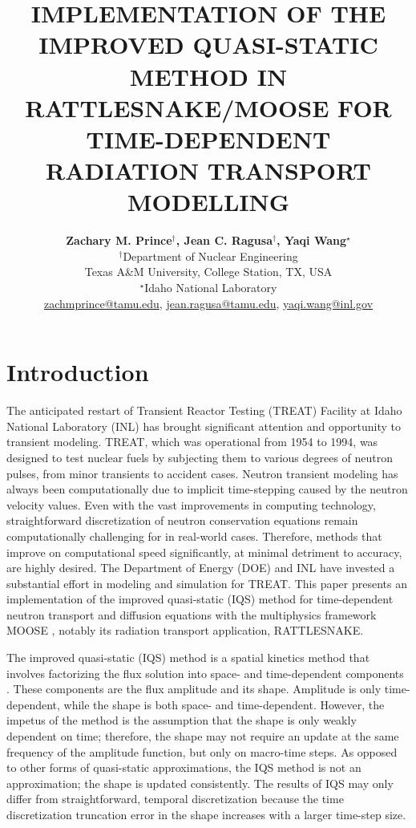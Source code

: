 \documentclass[12pt]{article}
\title{IMPLEMENTATION OF THE IMPROVED QUASI-STATIC METHOD IN RATTLESNAKE/MOOSE FOR TIME-DEPENDENT RADIATION TRANSPORT MODELLING}
\author{ 
  \textbf{Zachary M. Prince$^\dagger$, Jean C. Ragusa$^\dagger$, Yaqi Wang$^\star$} \\
 $^\dagger$Department of Nuclear Engineering \\
  Texas A\&M University, College Station, TX, USA\\
  $^\star$Idaho National Laboratory\\
  \href{mailto:zachmprince@tamu.edu}{zachmprince@tamu.edu}, \href{jean.ragusa@tamu.edu}{jean.ragusa@tamu.edu}, \href{yaqi.wang@inl.gov}{yaqi.wang@inl.gov} 
}
\begin{document}

\maketitle

%
\section{Introduction}
\label{sect::intro}

The anticipated restart of Transient Reactor Testing (TREAT) Facility at Idaho National Laboratory (INL) has brought significant attention and opportunity to transient modeling.  TREAT, which was operational from 1954 to 1994, was designed to test nuclear fuels by subjecting them to various degrees of neutron pulses, from minor transients to accident cases.  Neutron transient modeling has always been computationally due to implicit time-stepping caused by the neutron velocity values. Even with the vast improvements in computing technology, straightforward discretization of neutron conservation equations remain computationally challenging for in real-world cases.  Therefore, methods that improve on computational speed significantly, at minimal detriment to accuracy, are highly desired. The Department of Energy (DOE) and INL have invested a substantial effort in modeling and simulation for TREAT.  This paper presents an implementation of the improved quasi-static (IQS) method for time-dependent neutron transport and diffusion equations with the multiphysics framework MOOSE \cite{moose}, notably its radiation transport application, RATTLESNAKE.

The improved quasi-static (IQS) method is a spatial kinetics method that involves factorizing the flux solution into space- and time-dependent components \cite{Ott_1969,Dulla2008}.  These components are the flux amplitude and its shape. Amplitude is only time-dependent, while the shape is both space- and time-dependent.  However, the impetus of the method is the assumption that the shape is only weakly dependent on time; therefore, the shape may not require an update  at the same frequency of the amplitude function, but only on macro-time steps. As opposed to other forms of quasi-static approximations, the IQS method is not an approximation; the shape is updated consistently.  The results of IQS may only differ from straightforward, temporal discretization because the time discretization truncation error in the shape increases with a larger time-step size. 
\end{document}
